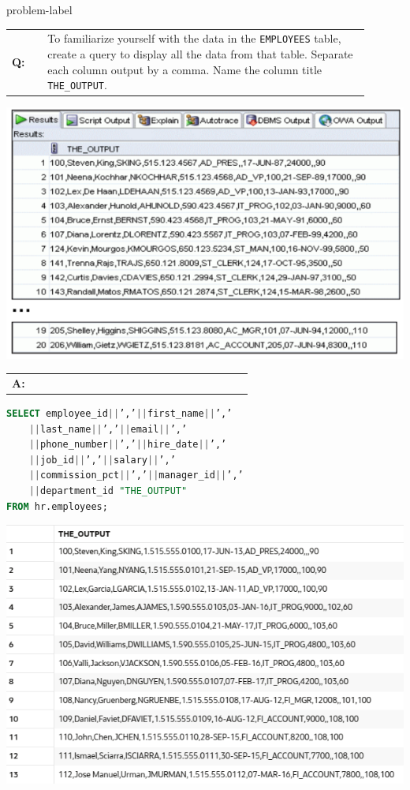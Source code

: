 
\begin{problem}{}{problem-label}

\begin{tabular}{@{}l p{0.9\linewidth}@{}}
  \textbf{Q:} & To familiarize yourself with the data in the \texttt{EMPLOYEES} table, create a query to display all the data from that table. Separate each column output by a comma. Name the column title \texttt{THE\_OUTPUT}.
\end{tabular}

\begin{center}
  \includegraphics[scale=0.5]{images/c1q10.png}
\end{center}

\begin{tabular}{@{}l p{0.9\linewidth}@{}}
  \textbf{A:} &
\end{tabular}

\begin{lstlisting}[language=SQL]
SELECT employee_id||’,’||first_name||’,’
    ||last_name||’,’||email||’,’
    ||phone_number||’,’||hire_date||’,’
    ||job_id||’,’||salary||’,’
    ||commission_pct||’,’||manager_id||’,’
    ||department_id "THE_OUTPUT"
FROM hr.employees;
\end{lstlisting}

\begin{center}
  \includegraphics[scale=0.6]{images/c1a12.png}
\end{center}

\end{problem}


